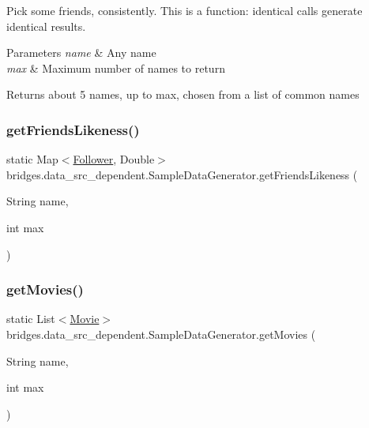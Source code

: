 Pick some friends, consistently. This is a function\+: identical calls generate identical results. 
\begin{DoxyParams}{Parameters}
{\em name} & Any name \\
\hline
{\em max} & Maximum number of names to return \\
\hline
\end{DoxyParams}
\begin{DoxyReturn}{Returns}
about 5 names, up to max, chosen from a list of common names 
\end{DoxyReturn}
\hypertarget{classbridges_1_1data__src__dependent_1_1_sample_data_generator_a940034ad3107806e65741dca0a029d1b}{}\label{classbridges_1_1data__src__dependent_1_1_sample_data_generator_a940034ad3107806e65741dca0a029d1b} 
\subsubsection{\texorpdfstring{get\+Friends\+Likeness()}{getFriendsLikeness()}}
{\footnotesize\ttfamily static Map$<$\hyperlink{classbridges_1_1data__src__dependent_1_1_follower}{Follower}, Double$>$ bridges.\+data\+\_\+src\+\_\+dependent.\+Sample\+Data\+Generator.\+get\+Friends\+Likeness (\begin{DoxyParamCaption}\item[{String}]{name,  }\item[{int}]{max }\end{DoxyParamCaption})\hspace{0.3cm}{\ttfamily [static]}}

\hypertarget{classbridges_1_1data__src__dependent_1_1_sample_data_generator_a5b654cc82316f320ad9b001aa7cdcfb9}{}\label{classbridges_1_1data__src__dependent_1_1_sample_data_generator_a5b654cc82316f320ad9b001aa7cdcfb9} 
\subsubsection{\texorpdfstring{get\+Movies()}{getMovies()}}
{\footnotesize\ttfamily static List$<$\hyperlink{classbridges_1_1data__src__dependent_1_1_movie}{Movie}$>$ bridges.\+data\+\_\+src\+\_\+dependent.\+Sample\+Data\+Generator.\+get\+Movies (\begin{DoxyParamCaption}\item[{String}]{name,  }\item[{int}]{max }\end{DoxyParamCaption})\hspace{0.3cm}{\ttfamily [static]}}

